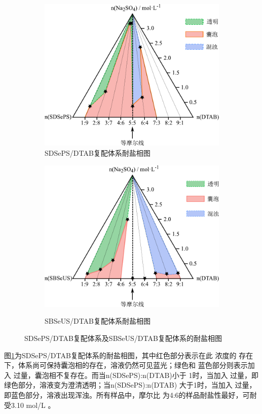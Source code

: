 \documentclass[bachelor,winfonts,replaceperiod]{jnuthesis}
\begin{document}
    \begin{figure}[htbp]
        \centering
        \begin{subfigure}[]{\textwidth}
            \centering
            \includegraphics[width=0.52\linewidth]{figure/SDSePS-salt.pdf}
            \caption{SDSePS/DTAB复配体系耐盐相图}\label{fig:SDSePS-salt}
        \end{subfigure}%

        \begin{subfigure}[]{\textwidth}
            \centering
            \includegraphics[width=0.52\linewidth]{figure/SBSeUS-salt.pdf}\\
            \caption{SBSeUS/DTAB复配体系耐盐相图}\label{fig:SBSeUS-salt}
        \end{subfigure}%
        \caption{SDSePS/DTAB复配体系及SBSeUS/DTAB复配体系的耐盐相图}
        \label{fig:耐盐相图}
    \end{figure}

    图\ref{fig:SDSePS-salt}为SDSePS/DTAB复配体系的耐盐相图，其中红色部分表示在此
    浓度的 存在下，体系尚可保持囊泡相的存在，溶液仍然可见蓝光；绿色和
    蓝色部分则表示加入 过量，囊泡相不复存在。而当n(SDSePS):n(DTAB)小于
    1时，当加入 过量，即绿色部分，溶液变为澄清透明；当n(SDSePS):n(DTAB)
    大于1时，当加入 过量，即蓝色部分，溶液出现浑浊。所有样品中，摩尔比
    为4:6的样品耐盐性最好，可耐受3.10 mol/L 。
    
\end{document}
